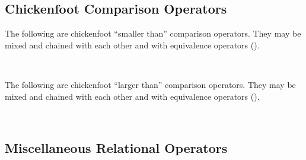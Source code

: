 \subsection{Chickenfoot Comparison Operators}

The following are chickenfoot ``smaller than'' comparison operators.  They may be mixed and chained
with each other and with equivalence operators ().
\begin{tabbing}
\UnicodeKillLine
{} \\
\end{tabbing}

The following are chickenfoot ``larger than'' comparison operators.  They may be mixed and chained
with each other and with equivalence operators ().
\begin{tabbing}
\UnicodeKillLine
{} \\
\end{tabbing}


\subsection{Miscellaneous Relational Operators}

